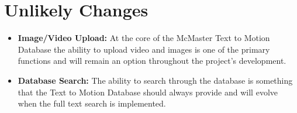 \documentclass{scrreprt}
\begin{document}
\section{Unlikely Changes}

\begin{itemize}
    \item \textbf {Image/Video Upload:} At the core of the McMaster Text to
            Motion Database the ability to upload video and images is one of
                  the primary functions and will remain an option throughout
                  the project's development.
    \item \textbf {Database Search:} The ability to search through the database
            is something that the Text to Motion Database should always provide
                  and will evolve when the full text search is implemented.
\end{itemize}
\end{document}
